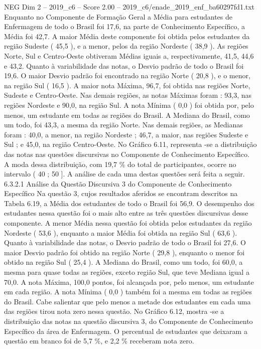 \begin{textsample}{NEG Dim 2 – 2019\_c6 – Score 2.00 – 2019\_c6/enade\_2019\_enf\_ba60297fd1.txt}
Enquanto no Componente de Formação Geral a Média para estudantes de Enfermagem de todo o Brasil foi 17,6, na parte de Conhecimento Específico, a Média foi 42,7.
A maior Média deste componente foi obtida pelos estudantes da região Sudeste ( 45,5 ), e a menor, pelos da região Nordeste ( 38,9 ).
As regiões Norte, Sul e Centro-Oeste obtiveram Médias iguais a, respectivamente, 41,5, 44,6 e 43,2.
Quanto à variabilidade das notas, o Desvio padrão de todo o Brasil foi 19,6.
O maior Desvio padrão foi encontrado na região Norte ( 20,8 ), e o menor, na região Sul ( 16,5 ).
A maior nota Máxima, 96,7, foi obtida nas regiões Norte, Sudeste e Centro-Oeste.
Nas demais regiões, as notas Máximas foram : 93,3, nas regiões Nordeste e 90,0, na região Sul.
A nota Mínima ( 0,0 ) foi obtida por, pelo menos, um estudante em todas as regiões do Brasil.
A Mediana do Brasil, como um todo, foi 43,3, a mesma da região Norte.
Nas demais regiões, as Medianas foram : 40,0, a menor, na região Nordeste ; 46,7, a maior, nas regiões Sudeste e Sul ; e 45,0, na região Centro-Oeste.
No Gráfico 6.11, representa -se a distribuição das notas nas questões discursivas no Componente de Conhecimento Específico.
A moda dessa distribuição, com 19,7 \% do total de participantes, ocorre no intervalo ( 40 ; 50 ].
A análise de cada uma destas questões será feita a seguir. 6.3.2.1 Análise da Questão Discursiva 3 do Componente de Conhecimento Específico Na questão 3, cujos resultados aferidos se encontram descritos na Tabela 6.19, a Média dos estudantes de todo o Brasil foi 56,9.
O desempenho dos estudantes nessa questão foi o mais alto entre as três questões discursivas desse componente.
A menor Média nessa questão foi obtida pelos estudantes da região Nordeste ( 53,6 ), enquanto a maior Média foi obtida na região Sul ( 63,6 ).
Quanto à variabilidade das notas, o Desvio padrão de todo o Brasil foi 27,6.
O maior Desvio padrão foi obtido na região Norte ( 29,8 ), enquanto o menor foi obtido na região Sul ( 25,4 ).
A Mediana do Brasil, como um todo, foi 60,0, a mesma para quase todas as regiões, exceto região Sul, que teve Mediana igual a 70,0.
A nota Máxima, 100,0 pontos, foi alcançada por, pelo menos, um estudante em cada região.
A nota Mínima ( 0,0 ) também foi a mesma em todas as regiões do Brasil.
Cabe salientar que pelo menos a metade dos estudantes em cada uma das regiões tirou nota zero nessa questão.
No Gráfico 6.12, mostra -se a distribuição das notas na questão discursiva 3, do Componente de Conhecimento Específico da área de Enfermagem.
O percentual de estudantes que deixaram a questão em branco foi de 5,7 \%, e 2,2 \% receberam nota zero.

\end{textsample}
